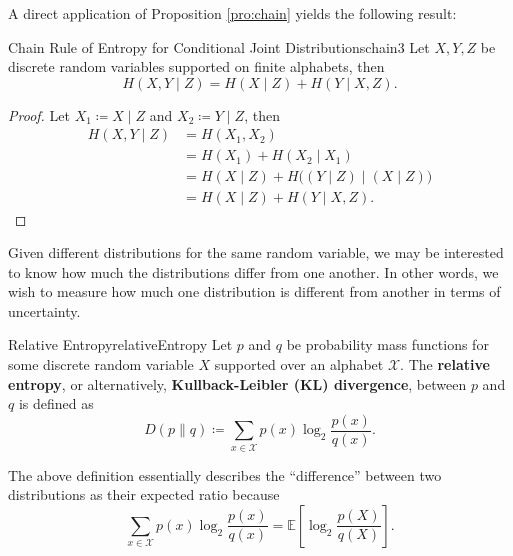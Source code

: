 \documentclass[math, code]{amznotes}
\theoremstyle{remark}
\begin{document}
A direct application of Proposition \ref{pro:chain} yields the following result:
\begin{corbox}{Chain Rule of Entropy for Conditional Joint Distributions}{chain3}
    Let $X, Y, Z$ be discrete random variables supported on finite alphabets, then 
    \begin{equation*}
        H\left(X, Y \mid Z\right) = H\left(X \mid Z\right) + H\left(Y \mid X, Z\right).
    \end{equation*}
    \tcblower
    \begin{proof}
        Let $X_1 \coloneqq X \mid Z$ and $X_2 \coloneqq Y \mid Z$, then 
        \begin{align*}
            H\left(X, Y \mid Z\right) & = H\left(X_1, X_2\right) \\
            & = H\left(X_1\right) + H\left(X_2 \mid X_1\right) \\
            & = H\left(X \mid Z\right) + H\bigl(\left(Y \mid Z\right) \mid \left(X \mid Z\right)\bigr) \\
            & = H\left(X \mid Z\right) + H\left(Y \mid X, Z\right).
        \end{align*}
    \end{proof}
\end{corbox}
Given different distributions for the same random variable, we may be interested to know how much the distributions differ from one another. In other words, we wish to measure how much one distribution is different from another in terms of uncertainty.
\begin{dfnbox}{Relative Entropy}{relativeEntropy}
    Let $p$ and $q$ be probability mass functions for some discrete random variable $X$ supported over an alphabet $\mathcal{X}$. The {\color{red} \textbf{relative entropy}}, or alternatively, {\color{red} \textbf{Kullback-Leibler (KL) divergence}}, between $p$ and $q$ is defined as 
    \begin{equation*}
        D\left(p \parallel q\right) \coloneqq \sum_{x \in \mathcal{X}}p\left(x\right)\log_2\frac{p\left(x\right)}{q\left(x\right)}.
    \end{equation*}
\end{dfnbox}
The above definition essentially describes the ``difference'' between two distributions as their expected ratio because 
\begin{equation*}
    \sum_{x \in \mathcal{X}}p\left(x\right)\log_2\frac{p\left(x\right)}{q\left(x\right)} = \mathbb{E}\left[\log_2\frac{p(X)}{q(X)}\right].
\end{equation*}
\end{document}
